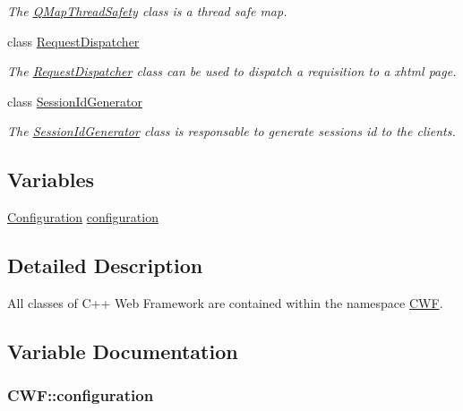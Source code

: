 \begin{DoxyCompactItemize}
\begin{DoxyCompactList}\small\item\em The \hyperlink{class_c_w_f_1_1_q_map_thread_safety}{Q\+Map\+Thread\+Safety} class is a thread safe map. \end{DoxyCompactList}\item 
class \hyperlink{class_c_w_f_1_1_request_dispatcher}{Request\+Dispatcher}
\begin{DoxyCompactList}\small\item\em The \hyperlink{class_c_w_f_1_1_request_dispatcher}{Request\+Dispatcher} class can be used to dispatch a requisition to a xhtml page. \end{DoxyCompactList}\item 
class \hyperlink{class_c_w_f_1_1_session_id_generator}{Session\+Id\+Generator}
\begin{DoxyCompactList}\small\item\em The \hyperlink{class_c_w_f_1_1_session_id_generator}{Session\+Id\+Generator} class is responsable to generate sessions id to the clients. \end{DoxyCompactList}\end{DoxyCompactItemize}
\subsection*{Variables}
\begin{DoxyCompactItemize}
\item 
\hyperlink{class_c_w_f_1_1_configuration}{Configuration} \hyperlink{namespace_c_w_f_a2f275195c5c69646f7df4e917febe552}{configuration}
\end{DoxyCompactItemize}


\subsection{Detailed Description}
All classes of C++ Web Framework are contained within the namespace \hyperlink{namespace_c_w_f}{C\+W\+F}. 

\subsection{Variable Documentation}
\hypertarget{namespace_c_w_f_a2f275195c5c69646f7df4e917febe552}{
\subsubsection[{configuration}]{ C\+W\+F\+::configuration}}\label{namespace_c_w_f_a2f275195c5c69646f7df4e917febe552}
